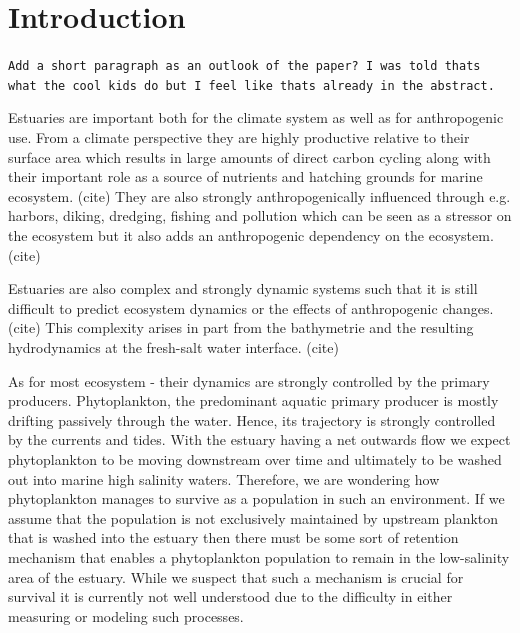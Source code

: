 \section*{Introduction}


\texttt{Add a short paragraph as an outlook of the paper? I was told thats what the cool kids do but I feel like thats already in the abstract.}


Estuaries are important both for the climate system as well as for anthropogenic use.
From a climate perspective they are highly productive relative to their surface area 
which results in large amounts of direct carbon cycling 
along with their important role as a source of nutrients and hatching grounds for marine ecosystem. (cite)
They are also strongly anthropogenically influenced through e.g. harbors, diking, dredging, fishing and pollution which can be seen as a stressor on the ecosystem but it also adds an anthropogenic dependency on the ecosystem. (cite)

Estuaries are also complex and strongly dynamic systems such that it is still difficult to predict ecosystem dynamics or the effects of anthropogenic changes. (cite)
This complexity arises in part from the bathymetrie and the resulting hydrodynamics at the fresh-salt water interface. (cite)

As for most ecosystem - their dynamics are strongly controlled by the primary producers.
Phytoplankton, the 	predominant aquatic primary producer is mostly drifting passively through the water.
Hence, its trajectory is strongly controlled by the currents and tides.
With the estuary having a net outwards flow we expect phytoplankton to be moving
 downstream over time and ultimately to be washed out into marine high salinity waters.
Therefore, we are wondering how phytoplankton manages to survive as a population in such an environment.
If we assume that the population is not exclusively maintained by upstream plankton that is washed into the estuary
 then there must be some sort of retention mechanism that enables a phytoplankton population to remain in the low-salinity area of the estuary.
While we suspect that such a mechanism is crucial for survival it is currently not well understood 
due to the difficulty in either measuring or modeling such processes.



